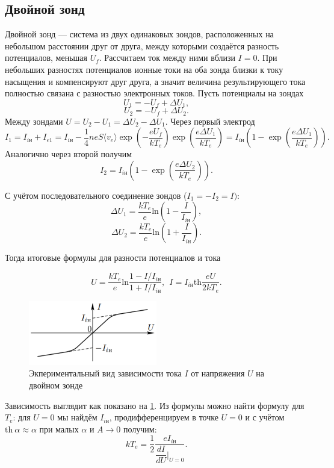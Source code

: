 \documentclass[12pt]{article}
\begin{document}
\subsection*{Двойной зонд}
Двойной зонд --- система из двух одинаковых зондов, расположенных на небольшом расстоянии друг от друга, между которыми создаётся разность потенциалов, меньшая $U_f$. Рассчитаем ток между ними вблизи $I=0$. При небольших разностях потенциалов ионные токи на оба зонда близки к току насыщения и компенсируют друг друга, а значит величина результирующего тока полностью связана с разностью электронных токов. Пусть потенциалы на зондах
$$
	U_1 = -U_f + \Delta U_1,
$$
$$
	U_2 = -U_f + \Delta U_2.
$$
Между зондами $U = U_2 - U_1 = \Delta U_2 - \Delta U_1$.
Через первый электрод
\[
	I_1 = I_{i\text{н}} + I_{e1} = I_{i\text{н}} - \dfrac{1}{4}neS\langle v_e\rangle \exp\left(-\dfrac{eU_f}{kT_e}\right)\exp\left(\dfrac{e\Delta U_1}{kT_e}\right)=I_{i\text{н}}\left(1 - \exp\left( \dfrac{e\Delta U_1}{kT_e} \right)\right).
\]
Аналогично через второй получим
\[
	I_2 = I_{i\text{н}}\left(1 - \exp\left( \dfrac{e\Delta U_2}{kT_e} \right)\right).
\]

С учётом последовательного соединение зондов ($I_1 = -I_2 = I)$:
$$
	\Delta U_1= \dfrac{kT_e}{e}\text{ln}\left(1 - \dfrac{I}{I_{i\text{н}}}\right),
$$
$$
	\Delta U_2= \dfrac{kT_e}{e}\text{ln}\left(1 + \dfrac{I}{I_{i\text{н}}}\right).
$$

Тогда итоговые формулы для разности потенциалов и тока

\begin{equation}
	U = \dfrac{kT_e}{e}\text{ln}\dfrac{1 - I/I_{i\text{н}}}{1 + I/I_{i\text{н}}}, \ \
	I = I_{i\text{н}} \text{th}\dfrac{eU}{2kT_e}.
	\label{eq:3}
\end{equation}

\begin{figure}[H]
	\centering
	\includegraphics[width=0.5\textwidth]{4.png}
	\caption{Экпериментальный вид зависимости тока $I$ от напряжения $U$ на двойном зонде
	}
	\label{pic:graph}
\end{figure}
Зависимость выглядит как показано на \ref{pic:graph}.
Из формулы можно найти формулу для $T_e$: для $U=0$ мы найдём $I_{i\text{н}}$, продифференцируем в точке $U=0$ и с учётом $\text{th}~\alpha \approx \alpha$ при малых $\alpha$ и $A\rightarrow 0$ получим:
\begin{equation}
	kT_e = \dfrac{1}{2}\dfrac{eI_{i\text{н}}}{\dfrac{dI}{dU}|_{U=0}}.
\end{equation}
\end{document}
